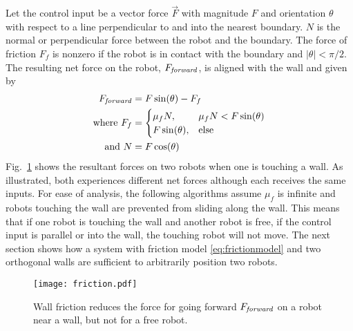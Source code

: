Let the control input be a vector force $\vec{F}$ with magnitude $F$ and orientation $\theta$ with respect to a line perpendicular to and into the nearest boundary. $N$ is the normal or perpendicular force between the robot and the boundary. The force of friction $F_f$ is nonzero if the robot is in contact with the boundary and  $|\theta| < \pi/2$. The resulting net force on the robot, $F_{\text{\emph{forward}}}$, is aligned with the wall and given by
\begin{align}
F_{\text{\emph{forward}}} &=  F \sin(\theta) - F_f  \nonumber \\
\text{where }  F_f &= \begin{cases}  \mu_f N, &  \mu_f N < F \sin(\theta)  \label{eq:frictionmodel}  \\
F \sin(\theta), & \text{else} \end{cases} \\ %
\text{and } N &= F \cos(\theta) \nonumber
\end{align}
 Fig.~\ref{fig:friction} shows the resultant forces on two robots when one is touching a wall. As illustrated, both experiences different net forces although each receives the same inputs.
  For ease of analysis, the following algorithms assume $\mu_f$ is infinite and robots touching the wall are prevented from sliding along the wall.
This means that if one robot is touching the wall and another robot is free, if the control input is parallel or into the wall, the touching robot will not move. 
The next section shows how a system with friction model \eqref{eq:frictionmodel} and two orthogonal walls are sufficient to arbitrarily position two robots. 
\begin{figure}[h]
\begin{center}
\texttt{[image: friction.pdf]} 
\caption{Wall friction reduces the force for going forward $F_{\text{\emph{forward}}}$ on a robot near a wall, but not for a free robot.}
\label{fig:friction}
\end{center}
\end{figure} 




